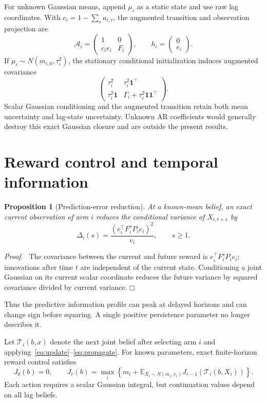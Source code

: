 \documentclass[11pt]{article}
\newtheorem{proposition}[theorem]{Proposition}
\newenvironment{proof}{\par\noindent\textit{Proof.}\ }{\hfill$\mdlgwhtsquare$\par\medskip}
\newcommand{\E}{\mathbb E}
\begin{document}
For unknown Gaussian means, append $\mu_i$ as a static state and use raw lag coordinates. With $c_i=1-\sum_ra_{i,r}$, the augmented transition and observation projection are
\begin{equation}
\mathcal A_i=\begin{pmatrix}1&0\\c_ie_i&F_i\end{pmatrix},\qquad
h_i=\begin{pmatrix}0\\e_i\end{pmatrix}.
\end{equation}
If $\mu_i\sim N(m_{i,0},\tau_i^2)$, the stationary conditional initialization induces augmented covariance
\[
\begin{pmatrix}
\tau_i^2&\tau_i^2\mathbf1^\top\\
\tau_i^2\mathbf1&\Gamma_i+\tau_i^2\mathbf1\mathbf1^\top
\end{pmatrix}.
\]
Scalar Gaussian conditioning and the augmented transition retain both mean uncertainty and lag-state uncertainty. Unknown AR coefficients would generally destroy this exact Gaussian closure and are outside the present results.

\section{Reward control and temporal information}
\begin{proposition}[Prediction-error reduction]
At a known-mean belief, an exact current observation of arm $i$ reduces the conditional variance of $X_{i,t+s}$ by
\begin{equation}
\boxed{\Delta_i(s)=\frac{(e_i^\top F_i^sP_ie_i)^2}{v_i},\qquad s\geq1.}
\label{eq:reduction}
\end{equation}
\end{proposition}
\begin{proof}
The covariance between the current and future reward is $e_i^\top F_i^sP_ie_i$; innovations after time $t$ are independent of the current state. Conditioning a joint Gaussian on its current scalar coordinate reduces the future variance by squared covariance divided by current variance.
\end{proof}
Thus the predictive information profile can peak at delayed horizons and can change sign before squaring. A single positive persistence parameter no longer describes it.

Let $\mathcal T_i(b,x)$ denote the next joint belief after selecting arm $i$ and applying~\eqref{eq:update}--\eqref{eq:propagate}. For known parameters, exact finite-horizon reward control satisfies
\begin{equation}
J_0(b)=0,\qquad
J_r(b)=\max_i\left\{m_i+\E_{X_i\sim N(m_i,v_i)}J_{r-1}(\mathcal T_i(b,X_i))\right\}.
\label{eq:bellman}
\end{equation}
Each action requires a scalar Gaussian integral, but continuation values depend on all lag beliefs.
\end{document}
